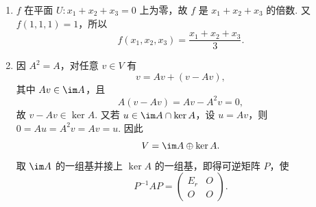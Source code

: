 \begin{enumerate}
\begin{enumerate}
        由于 $r=\dim\im T=2$，设 $\begin{pmatrix}
            E_r  &  O \\ O  &  O
        \end{pmatrix}=P^{-1}MQ^{-1}$，其中 $P$ 和 $Q$ 分别是 $6$ 级和 $4$ 级可逆矩阵，利用行列变换求得矩阵 $P=\begin{pmatrix}
            1 & 0 & 0 & 0 & 0 & 0\\
            0 & 1 & 0 & 0 & 0 & 0\\
            -1 & 0 & 1 & 0 & 0 & 0\\
            0 & -1 & 0 & 1 & 0 & 0\\
            0 & 0 & 0 & 0 & 1 & 0\\
            0 & 0 & 0 & 0 & 0 & 1
        \end{pmatrix}$，$Q=\begin{pmatrix}
            1 & 0 & -1 & 0\\
            0 & 1 & 0 & -1\\
            0 & 0 & 1 & 0\\
            0 & 0 & 0 & 1
        \end{pmatrix}$，$Q^{-1}=\begin{pmatrix}
            1 & 0 & 1 & 0\\
            0 & 1 & 0 & 1\\
            0 & 0 & 1 & 0\\
            0 & 0 & 0 & 1
        \end{pmatrix}$. 由换基公式，所求的 $V$ 的一组基为 $(v_{11}, v_{12}, v_{21}, v_{22})Q^{-1}=(v_{11}, v_{12}, v_{11}+v_{21}, v_{12}+v_{22})$，$W$ 的一组基为 $(w_{11}, w_{12}, w_{21}, w_{22}, w_{31}, w_{32})P=(w_{11}-w_{21}, w_{12}-w_{22}, w_{21}, w_{22}, w_{31}, w_{32})$.
    \end{enumerate}

    \item $f$ 在平面 $U:x_1+x_2+x_3=0$ 上为零，故 $f$ 是 $x_1+x_2+x_3$ 的倍数. 又 $f(1,1,1)=1$，所以
    \[
        f(x_1,x_2,x_3)=\frac{x_1+x_2+x_3}{3}.
    \]

    \item 因 $A^2=A$，对任意 $v\in V$ 有
    \[
        v=Av+(v-Av),
    \]
    其中 $Av\in\im A$，且
    \[
        A(v-Av)=Av-A^2v=0,
    \]
    故 $v-Av\in\ker A$. 又若 $u\in\im A\cap\ker A$，设 $u=Av$，则 $0=Au=A^2v=Av=u$. 因此
    \[
        V=\im A\oplus\ker A.
    \]
    取 $\im A$ 的一组基并接上 $\ker A$ 的一组基，即得可逆矩阵 $P$，使
    \[
        P^{-1}AP=\begin{pmatrix}E_r & O\\O & O\end{pmatrix}.
    \]
\end{enumerate}

\clearpage
